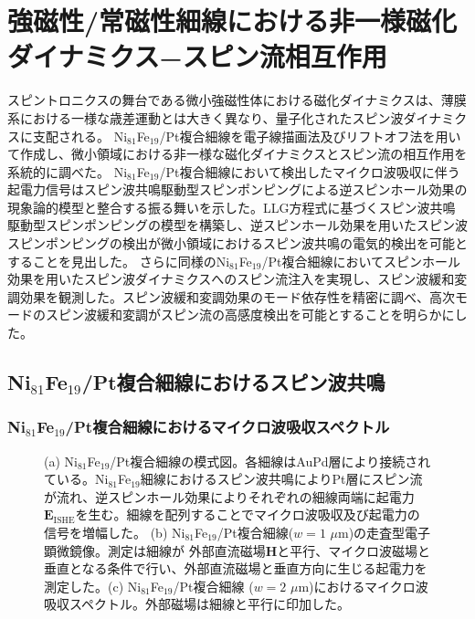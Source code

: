 
\chapter{強磁性/常磁性細線における非一様磁化ダイナミクス−スピン流相互作用}

スピントロニクスの舞台である微小強磁性体における磁化ダイナミクスは、薄膜系における一様な歳差運動とは大きく異なり、量子化されたスピン波ダイナミクスに支配される。
Ni$_{81}$Fe$_{19}$/Pt複合細線を電子線描画法及びリフトオフ法を用いて作成し、微小領域における非一様な磁化ダイナミクスとスピン流の相互作用を系統的に調べた。
Ni$_{81}$Fe$_{19}$/Pt複合細線において検出したマイクロ波吸収に伴う起電力信号はスピン波共鳴駆動型スピンポンピングによる逆スピンホール効果の現象論的模型と整合する振る舞いを示した。LLG方程式に基づくスピン波共鳴駆動型スピンポンピングの模型を構築し、逆スピンホール効果を用いたスピン波スピンポンピングの検出が微小領域におけるスピン波共鳴の電気的検出を可能とすることを見出した。
さらに同様のNi$_{81}$Fe$_{19}$/Pt複合細線においてスピンホール効果を用いたスピン波ダイナミクスへのスピン流注入を実現し、スピン波緩和変調効果を観測した。スピン波緩和変調効果のモード依存性を精密に調べ、高次モードのスピン波緩和変調がスピン流の高感度検出を可能とすることを明らかにした。


\section{Ni$_{81}$Fe$_{19}$/Pt複合細線におけるスピン波共鳴}
\subsection{Ni$_{81}$Fe$_{19}$/Pt複合細線におけるマイクロ波吸収スペクトル}


\begin{figure}[htbp]
 \begin{center}
 \end{center}
 \caption{(a) Ni$_{81}$Fe$_{19}$/Pt複合細線の模式図。各細線はAuPd層により接続されている。Ni$_{81}$Fe$_{19}$細線におけるスピン波共鳴によりPt層にスピン流が流れ、逆スピンホール効果によりそれぞれの細線両端に起電力$\bm{E}_\text{ISHE}$を生む。細線を配列することでマイクロ波吸収及び起電力の信号を増幅した。
(b) Ni$_{81}$Fe$_{19}$/Pt複合細線($w=1$ $\mu$m)の走査型電子顕微鏡像。測定は細線が
外部直流磁場$\bm{H}$と平行、マイクロ波磁場と垂直となる条件で行い、外部直流磁場と垂直方向に生じる起電力を測定した。(c) Ni$_{81}$Fe$_{19}$/Pt複合細線 ($w=2$ $\mu$m)におけるマイクロ波吸収スペクトル。外部磁場は細線と平行に印加した。}
 \label{spinwave_sample}
\end{figure}

